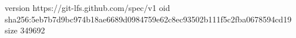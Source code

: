 version https://git-lfs.github.com/spec/v1
oid sha256:5eb7b7d9bc974b18ae6689d0984759e62c8ec93502b111f5c2fba0678594cd19
size 349692
